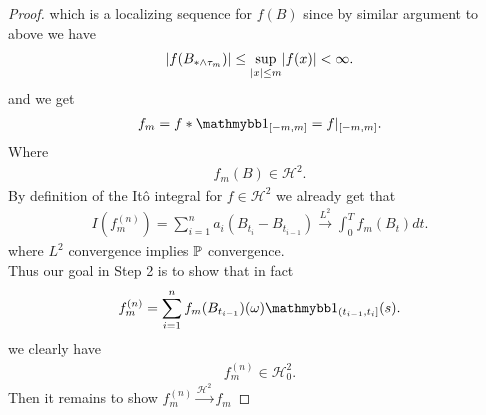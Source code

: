 \begin{proof}
which is a localizing sequence for $f(B)$ since by similar argument to above we have 
\begin{align*}
  \abs{f(B_{* \land \tau_m})} \le  \sup_{\abs{x} \le m} \abs{f(x)} < \infty
.\end{align*}
and we get 
\begin{align*}
  f_m = f*\cha_{[-m,m]}  = f\rvert_{[-m,m]}
.\end{align*}
Where 
\begin{align*}
  f_m(B) \in  \mathcal{H}^2
.\end{align*}
By definition of the It\^o integral for $f \in \mathcal{H}^2$ we already get that  
\begin{align*}
  I(f_m^{(n)} ) = \sum_{i=1}^{n} a_i (B_{t_{i}}  - B_{t_{i-1}}) \xrightarrow{L^2} \int_0^{T}  f_m(B_t) dt 
.\end{align*}
where $L^2$ convergence implies $\P$ convergence. \\[1ex]
Thus our goal in Step 2 is to show that  in fact
\begin{align*}
  f_m^{(n)}   = \sum_{i=1}^{n}  f_m(B_{t_{i-1}})(\omega )\cha_{(t_{i-1},t_i]}(s) 
.\end{align*}
we clearly have
\begin{align*}
  f_m^{(n)}   \in  \mathcal{H}_{0}^2
.\end{align*}
Then it  remains to show $f_m^{(n)} \xrightarrow{\mathcal{H}^{2} } f_m $ 

\end{proof}
